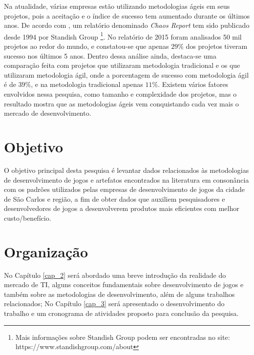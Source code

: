\documentclass[quali]{ppgccufscar}
\begin{document}
Na atualidade, várias empresas estão utilizando metodologias ágeis em seus projetos, pois a aceitação e o índice de sucesso tem aumentado durante os últimos anos. De acordo com , um relatório denominado \textit{Chaos Report} tem sido publicado desde 1994 por Standish Group \footnote{Mais informações sobre Standish Group podem ser encontradas no site: https://www.standishgroup.com/about}. No relatório de 2015 foram analisados 50 mil projetos ao redor do mundo, e constatou-se que apenas $29\%$ dos projetos tiveram sucesso nos últimos 5 anos. Dentro dessa análise ainda, destaca-se uma comparação feita com projetos que utilizaram metodologia tradicional e os que utilizaram metodologia ágil, onde a porcentagem de sucesso com metodologia ágil é de $39\%$, e na metodologia tradicional apenas $11\%$. Existem vários fatores envolvidos nessa pesquisa, como tamanho e complexidade dos projetos, mas o resultado mostra que as metodologias ágeis vem conquistando cada vez mais o mercado de desenvolvimento.


\section{Objetivo}

O objetivo principal desta pesquisa é levantar dados relacionados às metodologias de desenvolvimento de jogos e artefatos encontrados na literatura em consonância com os padrões utilizados pelas empresas de desenvolvimento de jogos da cidade de São Carlos e região, a fim de obter dados que auxiliem pesquisadores e desenvolvedores de jogos a desenvolverem produtos mais eficientes com melhor custo/benefício.
 

\section{Organização}

No Capítulo \ref{cap_2} será abordado uma breve introdução da realidade do mercado de TI, alguns conceitos fundamentais sobre desenvolvimento de jogos e também sobre as metodologias de desenvolvimento, além de alguns trabalhos relacionados; No Capítulo \ref{cap_3} será apresentado o desenvolvimento do trabalho e um cronograma de atividades proposto para conclusão da pesquisa.


\end{document}
